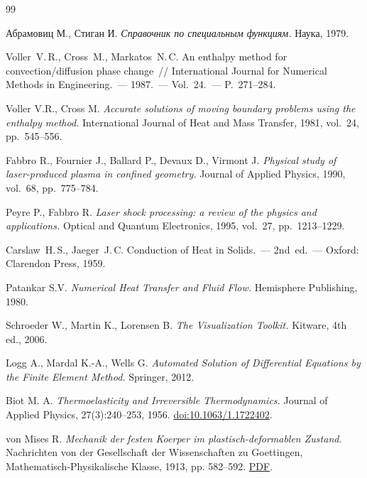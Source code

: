 

\begin{thebibliography}{99}

  Абрамовиц М., Стиган И.
  \textit{Справочник по специальным функциям.}
  Наука, 1979.

  Voller~V.\,R., Cross~M., Markatos~N.\,C.
  An enthalpy method for convection/diffusion phase change~//
  International Journal for Numerical Methods in Engineering.~---
  1987.~--- Vol.~24.~--- P.~271--284.

  Voller V.R., Cross M.
  \textit{Accurate solutions of moving boundary problems using the enthalpy method.}
  International Journal of Heat and Mass Transfer, 1981, vol.~24, pp.~545--556.

  Fabbro R., Fournier J., Ballard P., Devaux D., Virmont J.
  \textit{Physical study of laser-produced plasma in confined geometry.}
  Journal of Applied Physics, 1990, vol.~68, pp.~775--784.

  Peyre P., Fabbro R.
  \textit{Laser shock processing: a review of the physics and applications.}
  Optical and Quantum Electronics, 1995, vol.~27, pp.~1213--1229.

  Carslaw~H.\,S., Jaeger~J.\,C.
  Conduction of Heat in Solids.~--- 2nd~ed.~---
  Oxford: Clarendon Press, 1959.

  Patankar S.V.
  \textit{Numerical Heat Transfer and Fluid Flow.}
  Hemisphere Publishing, 1980.

  Schroeder W., Martin K., Lorensen B.
  \textit{The Visualization Toolkit.}
  Kitware, 4th ed., 2006.

  Logg A., Mardal K.-A., Wells G.
  \textit{Automated Solution of Differential Equations by the Finite Element Method.}
  Springer, 2012.

  Biot M. A.
  \textit{Thermoelasticity and Irreversible Thermodynamics.}
  Journal of Applied Physics, 27(3):240--253, 1956.
  \href{https://doi.org/10.1063/1.1722402}{doi:10.1063/1.1722402}.

  von Mises R.
  \textit{Mechanik der festen Koerper im plastisch-deformablen Zustand.}
  Nachrichten von der Gesellschaft der Wissenschaften zu Goettingen,
  Mathematisch-Physikalische Klasse, 1913, pp. 582--592.
  \href{https://neo-classical-physics.info/uploads/3/4/3/6/34363841/von_mises_-_plastic_deformation.pdf}{PDF}.


\end{thebibliography}
